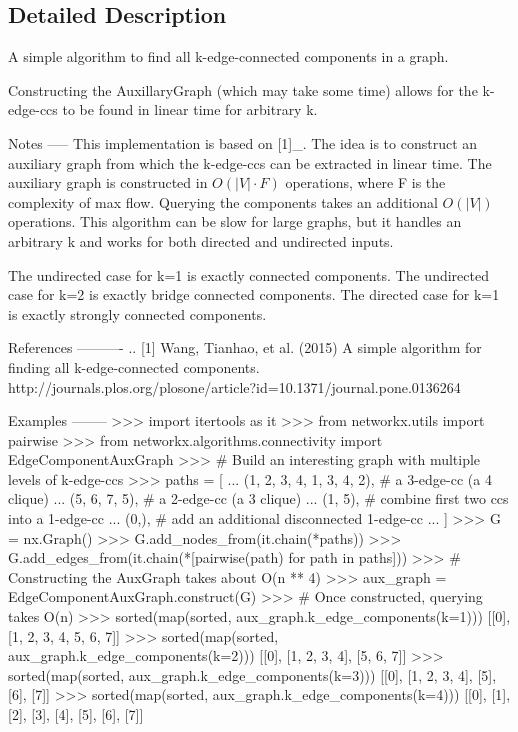 \subsection{Detailed Description}
\begin{DoxyVerb}A simple algorithm to find all k-edge-connected components in a graph.

Constructing the AuxillaryGraph (which may take some time) allows for the
k-edge-ccs to be found in linear time for arbitrary k.

Notes
-----
This implementation is based on [1]_. The idea is to construct an auxiliary
graph from which the k-edge-ccs can be extracted in linear time. The
auxiliary graph is constructed in $O(|V|\cdot F)$ operations, where F is the
complexity of max flow. Querying the components takes an additional $O(|V|)$
operations. This algorithm can be slow for large graphs, but it handles an
arbitrary k and works for both directed and undirected inputs.

The undirected case for k=1 is exactly connected components.
The undirected case for k=2 is exactly bridge connected components.
The directed case for k=1 is exactly strongly connected components.

References
----------
.. [1] Wang, Tianhao, et al. (2015) A simple algorithm for finding all
    k-edge-connected components.
    http://journals.plos.org/plosone/article?id=10.1371/journal.pone.0136264

Examples
--------
>>> import itertools as it
>>> from networkx.utils import pairwise
>>> from networkx.algorithms.connectivity import EdgeComponentAuxGraph
>>> # Build an interesting graph with multiple levels of k-edge-ccs
>>> paths = [
...     (1, 2, 3, 4, 1, 3, 4, 2),  # a 3-edge-cc (a 4 clique)
...     (5, 6, 7, 5),  # a 2-edge-cc (a 3 clique)
...     (1, 5),  # combine first two ccs into a 1-edge-cc
...     (0,),  # add an additional disconnected 1-edge-cc
... ]
>>> G = nx.Graph()
>>> G.add_nodes_from(it.chain(*paths))
>>> G.add_edges_from(it.chain(*[pairwise(path) for path in paths]))
>>> # Constructing the AuxGraph takes about O(n ** 4)
>>> aux_graph = EdgeComponentAuxGraph.construct(G)
>>> # Once constructed, querying takes O(n)
>>> sorted(map(sorted, aux_graph.k_edge_components(k=1)))
[[0], [1, 2, 3, 4, 5, 6, 7]]
>>> sorted(map(sorted, aux_graph.k_edge_components(k=2)))
[[0], [1, 2, 3, 4], [5, 6, 7]]
>>> sorted(map(sorted, aux_graph.k_edge_components(k=3)))
[[0], [1, 2, 3, 4], [5], [6], [7]]
>>> sorted(map(sorted, aux_graph.k_edge_components(k=4)))
[[0], [1], [2], [3], [4], [5], [6], [7]]


\end{DoxyVerb}
